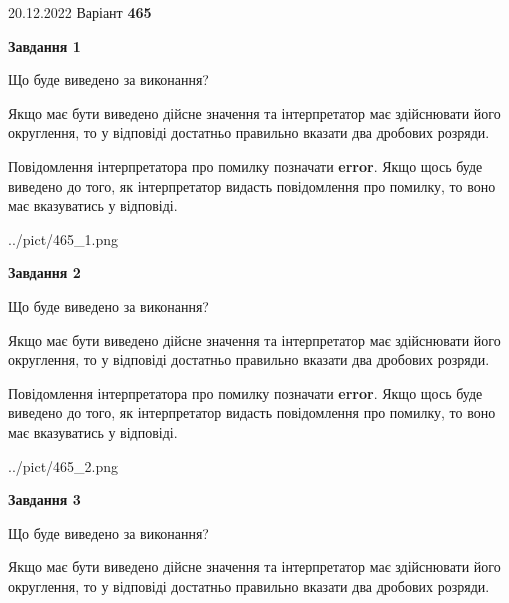\documentclass[12pt, ukrainian]{article}
\begin{document}
{20.12.2022 Варіант \No \textbf { 465 }\par}
{
\begin {Large}

{\begin {center}\textbf{Завдання 1}\end {center}}\par
Що буде виведено за виконання? \par

Якщо має бути виведено дійсне значення та інтерпретатор має здійснювати його округлення, 
то у відповіді достатньо правильно вказати два дробових розряди.

Повідомлення інтерпретатора про помилку позначати \textbf{error}.
Якщо щось буде виведено до того, як інтерпретатор видасть повідомлення про помилку, 
то воно має вказуватись у відповіді. \par

\begin{center}
	{../pict/465_1.png}
\end{center}
\newpage

{\begin {center}\textbf{Завдання 2}\end {center}}\par
Що буде виведено за виконання? \par

Якщо має бути виведено дійсне значення та інтерпретатор має здійснювати його округлення, 
то у відповіді достатньо правильно вказати два дробових розряди.

Повідомлення інтерпретатора про помилку позначати \textbf{error}.
Якщо щось буде виведено до того, як інтерпретатор видасть повідомлення про помилку, 
то воно має вказуватись у відповіді. \par

\begin{center}
	{../pict/465_2.png}
\end{center}
\newpage

{\begin {center}\textbf{Завдання 3}\end {center}}\par
Що буде виведено за виконання? \par

Якщо має бути виведено дійсне значення та інтерпретатор має здійснювати його округлення, 
то у відповіді достатньо правильно вказати два дробових розряди.


\end{Large}}
\end{document}
